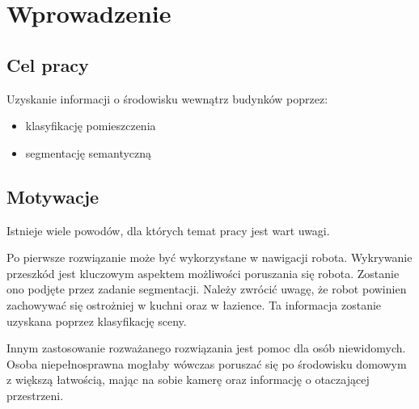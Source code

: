 \newpage %
\section{Wprowadzenie}

\subsection{Cel pracy}

Uzyskanie informacji o środowisku wewnątrz budynków poprzez:
\begin{itemize}
    \item klasyfikację pomieszczenia
    \item segmentację semantyczną
\end{itemize} 
\subsection{Motywacje}
Istnieje wiele powodów, dla których temat pracy jest wart uwagi.

Po pierwsze rozwiązanie może być wykorzystane w nawigacji robota. Wykrywanie przeszkód jest kluczowym aspektem możliwości poruszania się robota. Zostanie ono podjęte przez zadanie segmentacji. Należy zwrócić uwagę, że robot powinien zachowywać się ostrożniej w kuchni oraz w łazience. Ta informacja zostanie uzyskana poprzez klasyfikację sceny.

Innym zastosowanie rozważanego rozwiązania jest pomoc dla osób niewidomych. Osoba niepełnosprawna mogłaby wówczas poruszać się po środowisku domowym z większą łatwością, mając na sobie kamerę oraz informację o otaczającej przestrzeni.
